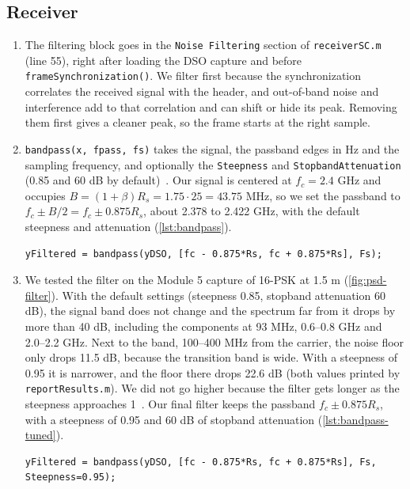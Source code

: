\documentclass[11pt]{article}
\begin{document}
\subsection*{Receiver}
\begin{enumerate}
    \item The filtering block goes in the \texttt{Noise Filtering} section of \texttt{receiverSC.m} (line 55), right after loading the DSO capture and before \texttt{frameSynchronization()}. We filter first because the synchronization correlates the received signal with the header, and out-of-band noise and interference add to that correlation and can shift or hide its peak. Removing them first gives a cleaner peak, so the frame starts at the right sample.

    \item \texttt{bandpass(x, fpass, fs)} takes the signal, the passband edges in Hz and the sampling frequency, and optionally the \texttt{Steepness} and \texttt{StopbandAttenuation} (0.85 and 60 dB by default)~\cite{bandpass}. Our signal is centered at $f_c = 2.4$ GHz and occupies $B = (1+\beta)R_s = 1.75 \cdot 25 = 43.75$ MHz, so we set the passband to $f_c \pm B/2 = f_c \pm 0.875R_s$, about 2.378 to 2.422 GHz, with the default steepness and attenuation (\cref{lst:bandpass}).

\begin{lstlisting}[caption={Our first noise filter for line 55 of \texttt{receiverSC.m}, before tuning it in Step 3.}, label={lst:bandpass}]
yFiltered = bandpass(yDSO, [fc - 0.875*Rs, fc + 0.875*Rs], Fs);
\end{lstlisting}

    \item We tested the filter on the Module 5 capture of 16-PSK at 1.5 m (\cref{fig:psd-filter}). With the default settings (steepness 0.85, stopband attenuation 60 dB), the signal band does not change and the spectrum far from it drops by more than 40 dB, including the components at 93 MHz, 0.6--0.8 GHz and 2.0--2.2 GHz. Next to the band, 100--400 MHz from the carrier, the noise floor only drops 11.5 dB, because the transition band is wide. With a steepness of 0.95 it is narrower, and the floor there drops 22.6 dB (both values printed by \texttt{reportResults.m}). We did not go higher because the filter gets longer as the steepness approaches 1~\cite{bandpass}. Our final filter keeps the passband $f_c \pm 0.875R_s$, with a steepness of 0.95 and 60 dB of stopband attenuation (\cref{lst:bandpass-tuned}).

\begin{lstlisting}[caption={Our tuned noise filter in \texttt{receiverSC.m}, used by the receiver.}, label={lst:bandpass-tuned}]
yFiltered = bandpass(yDSO, [fc - 0.875*Rs, fc + 0.875*Rs], Fs, Steepness=0.95);
\end{lstlisting}


\end{enumerate}
\end{document}
